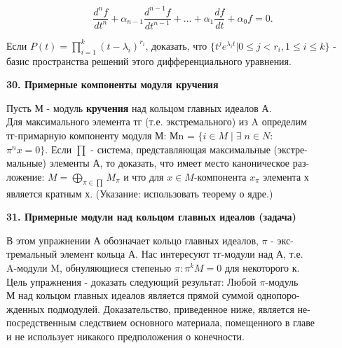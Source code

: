 \documentclass{../template/mai_book}
\begin{document}
\medskip

$$ \frac{d^{n}f}{dt^{n}}+\alpha_{n-1}\frac{d^{n-1}f}{dt^{n-1}}+...+\alpha_{1}\frac{df}{dt}+\alpha_{0}f = 0.$$

\medskip

Если $P(t) = \prod^k_{i=1}(t-\lambda_i)^{r_i}$, доказать, что $\{t^je^{\lambda_it}| 0 \leqslant j < r_i, 1 \leqslant i \leqslant k\} $\linebreak
- базис пространства решений этого дифференциального уравнения. 

\medskip

{\noindent\bf30. Примерные компоненты модуля кручения} 

\medskip

Пусть М - модуль \textbf{кручения} над кольцом главных идеалов А. \\
Для максимального элемента тг (т.е. экстремального) из A определим\\ 
тг-примарную компоненту модуля М: Мn = $\{i \in M \;|\; \exists\; n \in N :$\\ 
$\pi^nx = 0\}$. Если $\prod$ - система, представляющая максимальные 
(экстре-\\мальные) элементы А, то доказать, что имеет место каноническое 
раз-\\ложение: $ M = \bigoplus_{\pi\in\prod} M_{\pi} $ и что для $ x \in M $-компонента $x_\pi$ элемента х\\ 
является кратным х. (Указание: использовать теорему о ядре.)

\medskip

{\noindent\bf31. Примерные модули над кольцом главных идеалов (задача)}

\medskip

В этом упражнении А обозначает кольцо главных идеалов, $\pi$ - 
экс-\\тремальный элемент кольца А. Нас интересуют тг-модули над А, т.е.\\ 
A-модули M, обнуляющиеся степенью $\pi: \pi^kM = 0$ для некоторого к.\\ 
Цель упражнения - доказать следующий результат: Любой $\pi$-модуль\\ 
М над кольцом главных идеалов является прямой суммой однопоро-\\ 
жденных подмодулей. Доказательство, приведенное ниже, является 
не-\\посредственным следствием основного материала, помещенного в главе\\ 
и не использует никакого предположения о конечности. 
\end{document}
